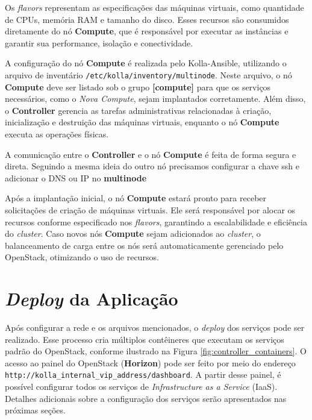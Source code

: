 Os \textit{flavors} representam as especificações das máquinas virtuais, como quantidade de CPUs, memória RAM e tamanho do disco. Esses recursos são consumidos diretamente do nó \textbf{Compute}, que é responsável por executar as instâncias e garantir sua performance, isolação e conectividade.

A configuração do nó \textbf{Compute} é realizada pelo Kolla-Ansible, utilizando o arquivo de inventário \texttt{/etc/kolla/inventory/multinode}. Neste arquivo, o nó \textbf{Compute} deve ser listado sob o grupo \textbf{[compute]} para que os serviços necessários, como o \textit{Nova Compute}, sejam implantados corretamente. Além disso, o \textbf{Controller} gerencia as tarefas administrativas relacionadas à criação, inicialização e destruição das máquinas virtuais, enquanto o nó \textbf{Compute} executa as operações físicas.

A comunicação entre o \textbf{Controller} e o nó \textbf{Compute} é feita de forma segura e direta. Seguindo a mesma ideia do outro nó precisamos configurar a chave ssh e adicionar o DNS ou IP no \textbf{multinode}

Após a implantação inicial, o nó \textbf{Compute} estará pronto para receber solicitações de criação de máquinas virtuais. Ele será responsável por alocar os recursos conforme especificado nos \textit{flavors}, garantindo a escalabilidade e eficiência do \textit{cluster}. Caso novos nós \textbf{Compute} sejam adicionados ao \textit{cluster}, o balanceamento de carga entre os nós será automaticamente gerenciado pelo OpenStack, otimizando o uso de recursos.


\section{\textit{Deploy} da Aplicação}
Após configurar a rede e os arquivos mencionados, o \textit{deploy} dos serviços pode ser realizado. Esse processo cria múltiplos contêineres que executam os serviços padrão do OpenStack, conforme ilustrado na Figura \ref{fig:controller_containers}. O acesso ao painel do OpenStack (\textbf{Horizon}) pode ser feito por meio do endereço \texttt{http://kolla\_internal\_vip\_address/dashboard}. A partir desse painel, é possível configurar todos os serviços de \textit{Infrastructure as a Service} (IaaS). Detalhes adicionais sobre a configuração dos serviços serão apresentados nas próximas seções.


